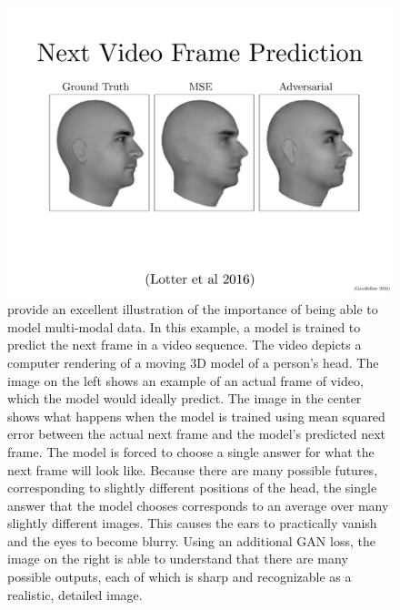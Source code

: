 \begin{figure}
\centering
\includegraphics[width=\textwidth]{lotter.pdf}
\caption{
\citet{lotter2015unsupervised} provide an excellent illustration of the importance
of being able to model multi-modal data.
In this example, a model is trained to predict the next frame in a video sequence.
The video depicts a computer rendering of a moving 3D model of a person's head.
The image on the left shows an example of an actual frame of video, which the model
would ideally predict.
The image in the center shows what happens when the model is trained using mean
squared error between the actual next frame and the model's predicted next frame.
The model is forced to choose a single answer for what the next frame will look like.
Because there are many possible futures, corresponding to slightly different positions
of the head, the single answer that the model chooses corresponds to an average over
many slightly different images.
This causes the ears to practically vanish and the eyes to become blurry.
Using an additional GAN loss, the image on the right is able to understand that there
are many possible outputs, each of which is sharp and recognizable as a realistic,
detailed image.
}
  \label{fig:lotter}
\end{figure}

